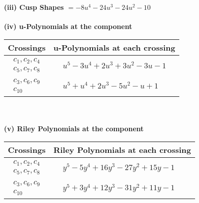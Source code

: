 \documentclass[1p]{elsarticle_modified}
\theoremstyle{definition}
\begin{document}
\flushleft \textbf{(iii) Cusp Shapes $= -8 u^4-24 u^3-24 u^2-10$}\\~\\
\newpage\renewcommand{\arraystretch}{1}
\flushleft \textbf{(iv) u-Polynomials at the component}\newline \\
\begin{tabular}{m{50pt}|m{274pt}}
Crossings & \hspace{64pt}u-Polynomials at each crossing \\
\hline $$\begin{aligned}c_{1},c_{2},c_{4}\\c_{5},c_{7},c_{8}\end{aligned}$$&$\begin{aligned}
&u^5-3 u^4+2 u^3+3 u^2-3 u-1
\end{aligned}$\\
\hline $$\begin{aligned}c_{3},c_{6},c_{9}\\c_{10}\end{aligned}$$&$\begin{aligned}
&u^5+u^4+2 u^3-5 u^2- u+1
\end{aligned}$\\
\hline
\end{tabular}\\~\\
\newpage\renewcommand{\arraystretch}{1}
\flushleft \textbf{(v) Riley Polynomials at the component}\newline \\
\begin{tabular}{m{50pt}|m{274pt}}
Crossings & \hspace{64pt}Riley Polynomials at each crossing \\
\hline $$\begin{aligned}c_{1},c_{2},c_{4}\\c_{5},c_{7},c_{8}\end{aligned}$$&$\begin{aligned}
&y^5-5 y^4+16 y^3-27 y^2+15 y-1
\end{aligned}$\\
\hline $$\begin{aligned}c_{3},c_{6},c_{9}\\c_{10}\end{aligned}$$&$\begin{aligned}
&y^5+3 y^4+12 y^3-31 y^2+11 y-1
\end{aligned}$\\
\hline
\end{tabular}\\~\\
\end{document}
